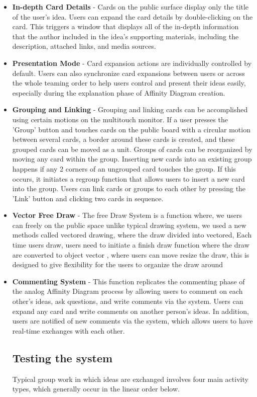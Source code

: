 \documentclass{sigchi}
\begin{document}
\begin{itemize}
\begin{itemize}
\item  \textbf{In-depth Card Details} - Cards on the public surface display only the title of the user's idea. Users can expand the card details by double-clicking on the card. This triggers a window that displays all of the in-depth information that the author included in the idea's supporting materials, including the description, attached links, and media sources. 
\item  \textbf{Presentation Mode} - Card expansion actions are individually controlled by default. Users can also synchronize card expansions between users or across the whole teaming order to help users control and present their ideas easily, especially during the explanation phase of Affinity Diagram creation.
\item \textbf{Grouping and Linking} -  Grouping and linking cards can be accomplished using certain motions on the multitouch monitor. If a user presses the 'Group' button and touches cards on the public board with a circular motion between several cards, a border around these cards is created, and these grouped cards can be moved as a unit. Groups of cards can be reorganized by moving any card within the group. Inserting new cards into an existing group happens if any 2 corners of an ungrouped card touches the group. If this occurs, it initiates a regroup function that allows users to insert a new card into the group. Users can link cards or groups to each other by pressing the 'Link' button and clicking two cards in sequence.  
\item \textbf{Vector Free Draw} - The free Draw System is a function where, we users can freely on the public space unlike typical drawing system, we used a new methods called vectored drawing, where the draw divided into vectored, Each time users draw, users need to initiate a finish draw function where the draw are converted to object vector , where users can move resize the draw, this is designed to give flexibility for the users to organize the draw around 
\item \textbf{Commenting System} - This function replicates the commenting phase of the analog Affinity Diagram process by allowing users to comment on each other's ideas, ask questions, and write comments via the system. Users can expand any card and write comments on another person's ideas. In addition, users are notified of new comments via the system, which allows users to have real-time exchanges with each other. 



\subsection{Testing the system}
Typical group work in which ideas are exchanged involves four main activity types, which generally occur in the linear order below.


\end{itemize}
\end{itemize}
\end{document}

